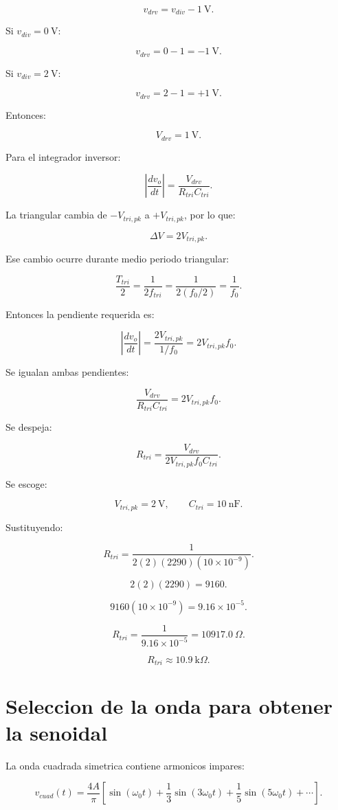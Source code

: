 \documentclass[11pt,letterpaper]{article}
\begin{document}
\[
v_{drv}=v_{div}-1~\text{V}.
\]

Si \(v_{div}=0~\text{V}\):

\[
v_{drv}=0-1=-1~\text{V}.
\]

Si \(v_{div}=2~\text{V}\):

\[
v_{drv}=2-1=+1~\text{V}.
\]

Entonces:

\[
V_{drv}=1~\text{V}.
\]

Para el integrador inversor:

\[
\left|\frac{dv_o}{dt}\right|=
\frac{V_{drv}}{R_{tri}C_{tri}}.
\]

La triangular cambia de \(-V_{tri,pk}\) a \(+V_{tri,pk}\), por lo que:

\[
\Delta V=2V_{tri,pk}.
\]

Ese cambio ocurre durante medio periodo triangular:

\[
\frac{T_{tri}}{2}
=
\frac{1}{2f_{tri}}
=
\frac{1}{2(f_0/2)}
=
\frac{1}{f_0}.
\]

Entonces la pendiente requerida es:

\[
\left|\frac{dv_o}{dt}\right|
=
\frac{2V_{tri,pk}}{1/f_0}
=
2V_{tri,pk}f_0.
\]

Se igualan ambas pendientes:

\[
\frac{V_{drv}}{R_{tri}C_{tri}}
=
2V_{tri,pk}f_0.
\]

Se despeja:

\[
R_{tri}=
\frac{V_{drv}}
{2V_{tri,pk}f_0C_{tri}}.
\]

Se escoge:

\[
V_{tri,pk}=2~\text{V},
\qquad
C_{tri}=10~\text{nF}.
\]

Sustituyendo:

\[
R_{tri}=
\frac{1}
{2(2)(2290)(10\times 10^{-9})}.
\]

\[
2(2)(2290)=9160.
\]

\[
9160(10\times 10^{-9})=9.16\times 10^{-5}.
\]

\[
R_{tri}=\frac{1}{9.16\times 10^{-5}}
=10917.0~\Omega.
\]

\[
\boxed{R_{tri}\approx 10.9~\text{k}\Omega}.
\]

\section{Seleccion de la onda para obtener la senoidal}

La onda cuadrada simetrica contiene armonicos impares:

\[
v_{cuad}(t)=
\frac{4A}{\pi}
\left[
\sin(\omega_0 t)
+\frac{1}{3}\sin(3\omega_0 t)
+\frac{1}{5}\sin(5\omega_0 t)
+\cdots
\right].
\]
\end{document}
